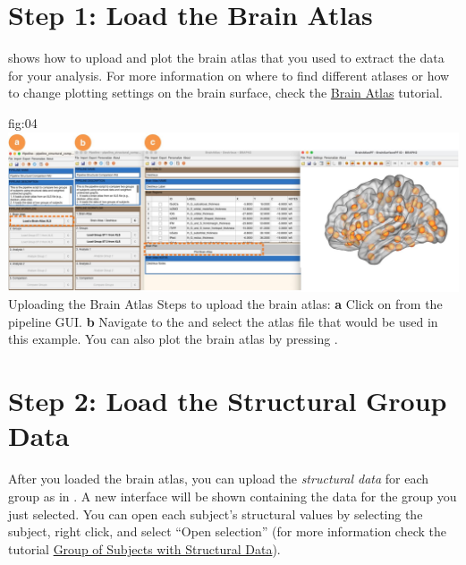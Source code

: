 \documentclass[justified]{tufte-handout}
\begin{document}

\clearpage

\section{Step 1: Load the Brain Atlas}

 shows how to upload and plot the brain atlas that you used to extract the data for your analysis. For more information on where to find different atlases or how to change plotting settings on the brain surface, check the \href{https://github.com/braph-software/BRAPH-2/tree/develop/tutorials/data/tut_ba}{Brain Atlas} tutorial.

	{fig:04}
	{\includegraphics{fig04.jpg}}
	{Uploading the Brain Atlas}
	{
	Steps to upload the brain atlas:
	{\bf a} Click on  from the pipeline GUI.
	{\bf b} Navigate to the  and select the atlas file  that would be used in this example. You can also plot the brain atlas by pressing . 
	}

 
\section{Step 2: Load the Structural Group Data}

After you loaded the brain atlas, you can upload the \emph{structural data} for each group as in . A new interface will be shown containing the data for the group you just selected. You can open each subject’s structural values by selecting the subject, right click, and select “Open selection” (for more information check the tutorial \href{https://github.com/braph-software/BRAPH-2/tree/develop/tutorials/data/tut_gr_st}{Group of Subjects with Structural Data}).	
\end{document}
